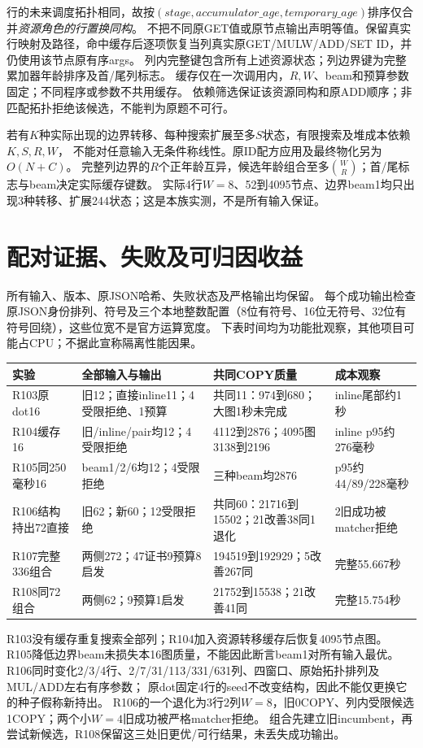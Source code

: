 \documentclass[UTF8,11pt,a4paper]{ctexart}
\begin{document}
行的未来调度拓扑相同，故按$(stage,accumulator\_age,temporary\_age)$排序仅合并\emph{资源角色的行置换同构}。
不把不同原GET值或原节点输出声明等值。保留真实行映射及路径，命中缓存后逐项恢复当列真实原GET/MULW/ADD/SET ID，并仍使用该节点原有序args。
列内完整键包含所有上述资源状态；列边界键为完整累加器年龄排序及首/尾列标志。
缓存仅在一次调用内，$R,W$、beam和预算参数固定；不同程序或参数不共用缓存。
依赖筛选保证该资源同构和原ADD顺序；非匹配拓扑拒绝该候选，不能判为原题不可行。

若有$K$种实际出现的边界转移、每种搜索扩展至多$S$状态，有限搜索及堆成本依赖$K,S,R,W$，
不能对任意输入无条件称线性。原ID配方应用及最终物化另为$O(N+C)$。
完整列边界的$R$个正年龄互异，候选年龄组合至多$\binom WR$；首/尾标志与beam决定实际缓存键数。
实际4行$W=8$、52到4095节点、边界beam1均只出现3种转移、扩展244状态；这是本族实测，不是所有输入保证。

\section{配对证据、失败及可归因收益}
所有输入、版本、原JSON哈希、失败状态及严格输出均保留。
每个成功输出检查原JSON身份排列、符号及三个本地整数配置（8位有符号、16位无符号、32位有符号回绕），这些位宽不是官方运算宽度。
下表时间均为功能批观察，其他项目可能占CPU；不据此宣称隔离性能因果。

\begin{longtable}{p{}p{}p{}p{}}
\toprule
实验 & 全部输入与输出 & 共同COPY质量 & 成本观察 \\
\midrule
R103原dot16 & 旧12；直接inline11；4受限拒绝、1预算 & 共同11：974到680；大图1秒未完成 & inline尾部约1秒 \\
R104缓存16 & 旧/inline/pair均12；4受限拒绝 & 4112到2876；4095图3138到2196 & inline p95约276毫秒 \\
R105同250毫秒16 & beam1/2/6均12；4受限拒绝 & 三种beam均2876 & p95约44/89/228毫秒 \\
R106结构持出72直接 & 旧62；新60；12受限拒绝 & 共同60：21716到15502；21改善38同1退化 & 2旧成功被matcher拒绝 \\
R107完整336组合 & 两侧272；47证书9预算8启发 & 194519到192929；5改善267同 & 完整55.667秒 \\
R108同72组合 & 两侧62；9预算1启发 & 21752到15538；21改善41同 & 完整15.754秒 \\
\bottomrule
\end{longtable}

R103没有缓存重复搜索全部列；R104加入资源转移缓存后恢复4095节点图。
R105降低边界beam未损失本16图质量，不能因此断言beam1对所有输入最优。
R106同时变化2/3/4行、2/7/31/113/331/631列、四窗口、原始拓扑排列及MUL/ADD左右有序参数；
原dot固定4行的seed不改变结构，因此不能仅更换它的种子假称新持出。
R106的一个退化为3行2列$W=8$，旧0COPY、列内受限候选1COPY；两个小$W=4$旧成功被严格matcher拒绝。
组合先建立旧incumbent，再尝试新候选，R108保留这三处旧更优/可行结果，未丢失成功输出。
\end{document}
